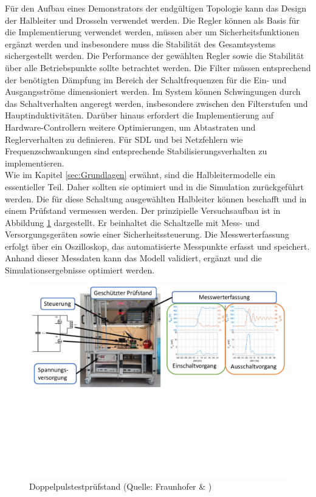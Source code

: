 Für den Aufbau eines Demonstrators der endgültigen Topologie kann das Design der Halbleiter und Drosseln verwendet werden. Die Regler können als Basis für die Implementierung verwendet werden, müssen aber um Sicherheitsfunktionen ergänzt werden und insbesondere muss die Stabilität des Gesamtsystems sichergestellt werden. Die Performance der gewählten Regler sowie die Stabilität über alle Betriebspunkte sollte betrachtet werden. Die Filter müssen entsprechend der benötigten Dämpfung im Bereich der Schaltfrequenzen für die Ein- und Ausgangsströme dimensioniert werden. Im System können Schwingungen durch das Schaltverhalten angeregt werden, insbesondere zwischen den Filterstufen und Hauptinduktivitäten. Darüber hinaus erfordert die Implementierung auf Hardware-Controllern weitere Optimierungen, um Abtastraten und Reglerverhalten zu definieren. Für \gls{SDL} und bei Netzfehlern wie Frequenzschwankungen sind entsprechende Stabilisierungsverhalten zu implementieren.\\
Wie im Kapitel \ref{sec:Grundlagen} erwähnt, sind die Halbleitermodelle ein essentieller Teil. Daher sollten sie optimiert und in die Simulation zurückgeführt werden. Die für diese Schaltung ausgewählten Halbleiter können beschafft und in einem Prüfstand vermessen werden. Der prinzipielle Versuchsaufbau ist in Abbildung \ref{fig:dpt} dargestellt. Er beinhaltet die Schaltzelle mit Mess- und Versorgungsgeräten sowie einer Sicherheitssteuerung. Die Messwerterfassung erfolgt über ein Oszilloskop, das automatisierte Messpunkte erfasst und speichert.  Anhand dieser Messdaten kann das Modell validiert, ergänzt und die Simulationsergebnisse optimiert werden.
\begin{figure} [H]
	\centering
	\includegraphics[width=0.95\linewidth]{content/Grafiken/DPT}
	\caption{Doppelpulstestprüfstand (Quelle: Fraunhofer \& \cite{kasseluniversitypress.12.09.2021})}
	\label{fig:dpt}
\end{figure}
